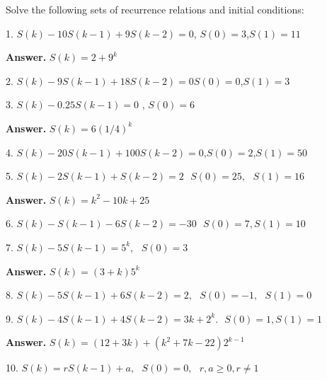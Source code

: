 \documentclass[10pt,]{book}
\theoremstyle{plain}
\theoremstyle{definition}
\theoremstyle{definition}
\theoremstyle{definition}
\theoremstyle{definition}
\numberwithin{equation}{section}
\begin{document}
Solve the following sets of recurrence relations and initial conditions:%
\begin{exercisegroup}
\item[1.]\hypertarget{exercise-12}{}
\(S(k) - 10S(k - 1) + 9S(k - 2) = 0\), \(S(0) = 3\),\(S(1) = 11\)%
\par\smallskip
\par\smallskip
\noindent\textbf{Answer.}\hypertarget{answer-7}{}\quad
 \(S(k)=2+9^k\)%
\item[2.]\hypertarget{exercise-13}{} \(S(k) - 9S(k - 1) + 18S(k - 2) = 0\)\(S(0) = 0\),\(S(1) = 3\)%
\par\smallskip
\item[3.]\hypertarget{exercise-14}{}\(S(k) - 0.25S(k - 1) = 0\) , \(S(0) = 6\)%
\par\smallskip
\par\smallskip
\noindent\textbf{Answer.}\hypertarget{answer-8}{}\quad
 \(S(k)=6(1/4)^k\)%
\item[4.]\hypertarget{exercise-15}{} \(S(k) - 20S(k - 1) + 100S(k - 2) = 0\),\(S(0) = 2\),\(S(1) = 50\)%
\par\smallskip
\item[5.]\hypertarget{exercise-16}{} \(S(k) - 2S(k - 1) + S(k - 2) = 2 \textrm{ }S(0) = 25,\textrm{  }S(1) = 16\)%
\par\smallskip
\par\smallskip
\noindent\textbf{Answer.}\hypertarget{answer-9}{}\quad
 \(S(k)=k^2-10k+25\)%
\item[6.]\hypertarget{exercise-17}{}\(S(k) - S(k - 1) - 6S(k - 2) = -30 \textrm{ }S(0) = 7, S(1) = 10\)%
\par\smallskip
\item[7.]\hypertarget{exercise-18}{}\(S(k) - 5S (k - 1) = 5^k,\textrm{  }S(0) = 3\)%
\par\smallskip
\par\smallskip
\noindent\textbf{Answer.}\hypertarget{answer-10}{}\quad
 \(S(k)=(3+k)5^k\)%
\item[8.]\hypertarget{exercise-19}{}\(S(k) - 5S(k - 1) + 6S(k - 2) = 2,\textrm{  }S(0) = -1,\textrm{  }S(1) = 0\)%
\par\smallskip
\item[9.]\hypertarget{exercise-20}{}\(S(k) - 4S(k - 1) + 4S(k - 2) = 3k + 2^k.\textrm{  }S(0) = 1, S(1) = 1\)%
\par\smallskip
\par\smallskip
\noindent\textbf{Answer.}\hypertarget{answer-11}{}\quad
 \(S(k)=(12+3k)+\left(k^2+7k-22\right)2^{k-1}\)%
\item[10.]\hypertarget{exercise-21}{} \(S(k) = r S(k - 1) + a ,\textrm{  }S(0) = 0,\textrm{   }r, a \geq  0, r \neq  1\)%

\end{exercisegroup}
\end{document}
